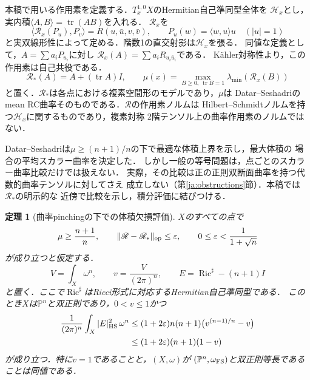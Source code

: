 \documentclass[12pt]{amsart}
\theoremstyle{definition}
\theoremstyle{remark}
\numberwithin{equation}{section}
\DeclareMathOperator{\Ric}{Ric}
\DeclareMathOperator{\tr}{tr}
\theoremstyle{plain}
\newtheorem{jthm}[thm]{定理}
\theoremstyle{remark}
\theoremstyle{definition}
\begin{document}
本稿で用いる作用素を定義する．$T_x^{1,0}X$のHermitian自己準同型全体を
$\mathcal H_x$とし，実内積$\langle A,B\rangle=\tr(AB)$を入れる．
$\mathscr R_x$を
\begin{equation}\label{ja:Rdef}
 \langle\mathscr R_x(P_u),P_v\rangle=R(u,\bar u,v,\bar v),
 \qquad P_u(w)=\langle w,u\rangle u\quad (|u|=1)
\end{equation}
と実双線形性によって定める．階数1の直交射影は$\mathcal H_x$を張る．
同値な定義として，$A=\sum a_iP_{u_i}$に対し
$\mathscr R_x(A)=\sum a_iR_{u_i\bar u_i}$である．
K\"ahler対称性より，この作用素は自己共役である．
\begin{equation}\label{ja:model}
 \mathscr R_*(A)=A+(\tr A)I,
 \qquad \mu(x)=\max_{B\geq0,\ \tr B=1}\lambda_{\min}(\mathscr R_x(B))
\end{equation}
と置く．$\mathscr R_*$は各点における複素空間形のモデルであり，$\mu$は
Datar--Seshadriのmean RC曲率そのものである．$\mathscr R$の作用素ノルムは
Hilbert--Schmidtノルムを持つ$\mathcal H_x$に関するものであり，複素対称
2階テンソル上の曲率作用素のノルムではない．

Datar--Seshadriは$\mu\geq(n+1)/n$の下で最適な体積上界を示し，最大体積の
場合の平均スカラー曲率を決定した\cite[Theorems 1.1 and 5.2]{ja:DS}．
しかし一般の等号問題は，点ごとのスカラー曲率比較だけでは扱えない．
実際，その比較は正の正則双断面曲率を持つ代数的曲率テンソルに対してさえ
成立しない（第\ref{ja:obstructions}節）．本稿では$\mathscr R_*$の明示的な
近傍で比較を示し，積分評価に結びつける．

\begin{jthm}[曲率pinchingの下での体積欠損評価]\label{ja:main}
$X$のすべての点で
\begin{equation}\label{ja:assumptions}
 \mu\geq\frac{n+1}{n},\qquad
 \|\mathscr R-\mathscr R_*\|_{\rm op}\leq\varepsilon,
 \qquad 0\leq\varepsilon<\frac1{1+\sqrt n}
\end{equation}
が成り立つと仮定する．
\[
 V=\int_X\omega^n,\qquad v=\frac{V}{(2\pi)^n},
 \qquad E=\Ric^\sharp-(n+1)I
\]
と置く．ここで$\Ric^\sharp$はRicci形式に対応するHermitian自己準同型である．
このとき$X$は$\mathbb P^n$と双正則であり，$0<v\leq1$かつ
\begin{align}
 \frac1{(2\pi)^n}\int_X |E|_{\rm HS}^2\,\omega^n
 &\leq (1+2\varepsilon)n(n+1)
       \bigl(v^{(n-1)/n}-v\bigr)\label{ja:sharpform}\\
 &\leq (1+2\varepsilon)(n+1)(1-v)\label{ja:deficit}
\end{align}
が成り立つ．特に$v=1$であることと，$(X,\omega)$が
$(\mathbb P^n,\omega_{\rm FS})$と双正則等長であることは同値である．
\end{jthm}
\end{document}
